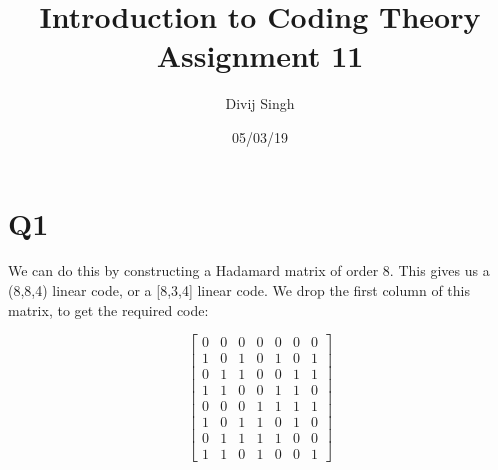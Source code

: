 \documentclass{article}
\title{Introduction to Coding Theory Assignment 11}
\author{Divij Singh}
\date{05/03/19}
\begin{document}
	\maketitle
	
	\section{Q1}

We can do this by constructing a Hadamard matrix of order 8. This gives us a (8,8,4) linear code, or a [8,3,4] linear code. We drop the first column of this matrix, to get the required code:


\[
\begin{bmatrix}{0} & {0} & {0} & {0} & {0} & {0} & {0} \\ {1} & {0} & {1} & {0} & {1} & {0} & {1} \\ {0} & {1} & {1} & {0} & {0} & {1} & {1} \\ {1} & {1} & {0} & {0} & {1} & {1} & {0} \\ {0} & {0} & {0} & {1} & {1} & {1} & {1} \\ {1} & {0} & {1} & {1} & {0} & {1} & {0} \\ {0} & {1} & {1} & {1} & {1} & {0} & {0} \\ {1} & {1} & {0} & {1} & {0} & {0} & {1}\end{bmatrix}
\]\\\\\\\\\\\\\\\\\\
\\\\\\\\\\\\\\\
\end{document}
